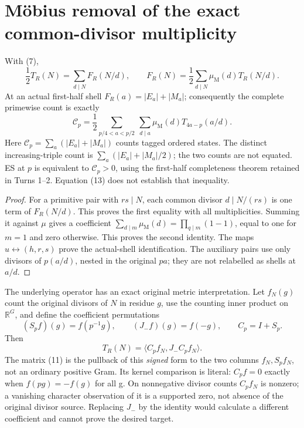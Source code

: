 \section{M\"obius removal of the exact common-divisor multiplicity}
\begin{theorem}\label{thm:mobius}
With (7),
\[
 \frac12T_R(N)=\sum_{d\mid N}F_R(N/d),\qquad
 \boxed{F_R(N)=\frac12\sum_{d\mid N}\mu_{\mathrm M}(d)T_R(N/d).}        \tag{12}
\]
At an actual first-half shell $F_R(a)=|E_a|+|M_a|$; consequently the complete
primewise count is exactly
\[
 \boxed{\mathcal C_p=\frac12\sum_{p/4<a<p/2}\ \sum_{d\mid a}
      \mu_{\mathrm M}(d)T_{4a-p}(a/d).}                               \tag{13}
\]
Here $\mathcal C_p=\sum_a(|E_a|+|M_a|)$ counts tagged ordered states.
The distinct increasing-triple count is $\sum_a(|E_a|+|M_a|/2)$; the two counts
are not equated. ES at $p$ is equivalent to $\mathcal C_p>0$, using the first-half completeness theorem
retained in Turns 1--2. Equation (13) does not establish that inequality.
\end{theorem}
\begin{proof}
For a primitive pair with $rs\mid N$, each common divisor $d\mid N/(rs)$
is one term of $F_R(N/d)$. This proves the first equality with all multiplicities.
Summing it against $\mu$ gives a coefficient
$\sum_{d\mid m}\mu_{\mathrm M}(d)=\prod_{q\mid m}(1-1)$, equal to one for $m=1$ and zero
otherwise. This proves the second identity. The maps $u\leftrightarrow(h,r,s)$
prove the actual-shell identification. The auxiliary pairs use only divisors of
$p(a/d)$, nested in the original $pa$; they are not relabelled as shells at $a/d$.
\end{proof}

The underlying operator has an exact original metric interpretation. Let
$f_N(g)$ count the original divisors of $N$ in residue $g$, use the counting
inner product on $\mathbb R^G$, and define the coefficient permutations
\[
 (S_pf)(g)=f(p^{-1}g),\qquad (J_-f)(g)=f(-g),\qquad C_p=I+S_p.
\]
Then
\[
 \boxed{T_R(N)=\langle C_pf_N,J_-C_pf_N\rangle.}           \tag{14a}
\]
The matrix (11) is the pullback of this \emph{signed} form to the two columns
$f_N,S_pf_N$, not an ordinary positive Gram. Its kernel comparison is literal:
$C_pf=0$ exactly when $f(pg)=-f(g)$ for all g. On nonnegative divisor counts
$C_pf_N$ is nonzero; a vanishing character observation of it is a supported
zero, not absence of the original divisor source. Replacing $J_-$ by the identity
would calculate a different coefficient and cannot prove the desired target.

